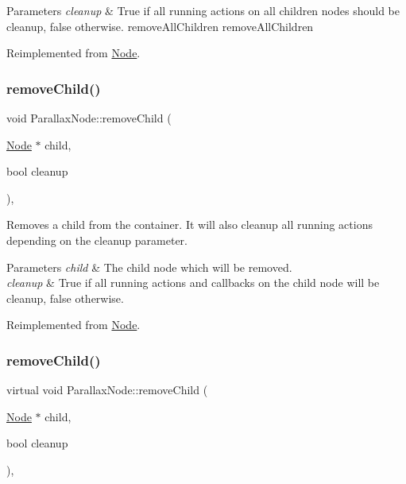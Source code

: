 \begin{DoxyParams}{Parameters}
{\em cleanup} & True if all running actions on all children nodes should be cleanup, false otherwise.  remove\+All\+Children  remove\+All\+Children \\
\hline
\end{DoxyParams}


Reimplemented from \hyperlink{classNode_aca66e2b385c3dbf1a6f55627c4a13192}{Node}.

\mbox{\label{classParallaxNode_ae7a8f0dc0855dd89ac16bc4bd3f55621}} 
\subsubsection{\texorpdfstring{remove\+Child()}{removeChild()}\hspace{0.1cm}{\footnotesize\ttfamily [1/2]}}
{\footnotesize\ttfamily void Parallax\+Node\+::remove\+Child (\begin{DoxyParamCaption}\item[{\hyperlink{classNode}{Node} $\ast$}]{child,  }\item[{bool}]{cleanup }\end{DoxyParamCaption})\hspace{0.3cm}{\ttfamily [override]}, {\ttfamily [virtual]}}

Removes a child from the container. It will also cleanup all running actions depending on the cleanup parameter.


\begin{DoxyParams}{Parameters}
{\em child} & The child node which will be removed. \\
\hline
{\em cleanup} & True if all running actions and callbacks on the child node will be cleanup, false otherwise. \\
\hline
\end{DoxyParams}


Reimplemented from \hyperlink{classNode_a872d4a7d389b26b0c6ad7ed99c8b1b65}{Node}.

\mbox{\label{classParallaxNode_a0ce03b1f03d63885b0ffae5a17662f45}} 
\subsubsection{\texorpdfstring{remove\+Child()}{removeChild()}\hspace{0.1cm}{\footnotesize\ttfamily [2/2]}}
{\footnotesize\ttfamily virtual void Parallax\+Node\+::remove\+Child (\begin{DoxyParamCaption}\item[{\hyperlink{classNode}{Node} $\ast$}]{child,  }\item[{bool}]{cleanup }\end{DoxyParamCaption})\hspace{0.3cm}{\ttfamily [override]}, {\ttfamily [virtual]}}

